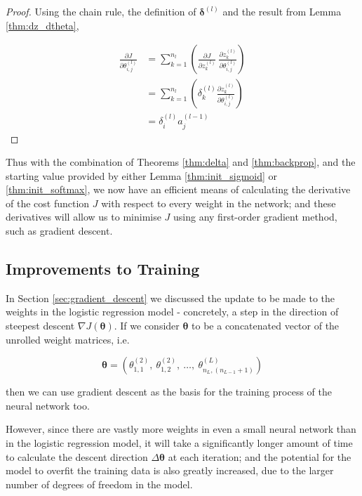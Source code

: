\documentclass{article}[11pt]
\begin{document}
        \begin{proof}
        
            Using the chain rule, the definition of $\boldsymbol{\delta}^{(l)}$ and the result from Lemma \ref{thm:dz_dtheta},
            
            $$ \begin{aligned}
            \frac{\partial J}{\partial \theta^{(l)}_{i,j}}
            &= \sum_{k=1}^{n_l} \left( \frac{\partial J}{\partial z^{(l)}_k} \ \frac{\partial z^{(l)}_k}{\partial \theta^{(l)}_{i,j}} \right) \\
            &= \sum_{k=1}^{n_l} \left( \delta^{(l)}_k \frac{\partial z^{(l)}_k}{\partial \theta^{(l)}_{i,j}} \right) \\
            &= \delta^{(l)}_i a^{(l-1)}_j
            \end{aligned}$$
        
        \end{proof}
        
        
        Thus with the combination of Theorems \ref{thm:delta} and \ref{thm:backprop}, and the starting value provided by either Lemma \ref{thm:init_sigmoid} or \ref{thm:init_softmax}, we now have an efficient means of calculating the derivative of the cost function $J$ with respect to every weight in the network; and these derivatives will allow us to minimise $J$ using any first-order gradient method, such as gradient descent.
        



    \subsection{Improvements to Training}
        
        In Section \ref{sec:gradient_descent} we discussed the update to be made to the weights in the logistic regression model - concretely, a step in the direction of steepest descent $\nabla J(\boldsymbol{\theta})$. If we consider $\boldsymbol{\theta}$ to be a concatenated vector of the unrolled weight matrices, i.e.
        
        $$
        \boldsymbol{\theta} = \left( \theta^{(2)}_{1,1}, \ \theta^{(2)}_{1,2}, \ \ldots, \ \theta^{(L)}_{n_L, (n_{L-1}+1)} \right)
        $$
        
        then we can use gradient descent as the basis for the training process of the neural network too.
        
        However, since there are vastly more weights in even a small neural network than in the logistic regression model, it will take a significantly longer amount of time to calculate the descent direction $\Delta \boldsymbol{\theta}$ at each iteration; and the potential for the model to overfit the training data is also greatly increased, due to the larger number of degrees of freedom in the model.
        
\end{document}
